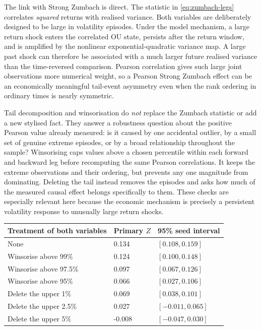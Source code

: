 \documentclass[11pt,a4paper]{article}
\begin{document}
The link with Strong Zumbach is direct. The statistic in \cref{eq:zumbach-legs} correlates
\emph{squared} returns with realised variance. Both variables are deliberately designed to be
large in volatility episodes. Under the model mechanism, a large return shock enters the
correlated OU state, persists after the return window, and is amplified by the nonlinear
exponential-quadratic variance map. A large past shock can therefore be associated with a much
larger future realised variance than the time-reversed comparison. Pearson correlation gives
such large joint observations more numerical weight, so a Pearson Strong Zumbach effect can be
an economically meaningful tail-event asymmetry even when the rank ordering in ordinary times
is nearly symmetric.

Tail decomposition and winsorisation do \emph{not} replace the Zumbach statistic or add a new
stylised fact. They answer a robustness question about the positive Pearson value already
measured: is it caused by one accidental outlier, by a small set of genuine extreme episodes, or
by a broad relationship throughout the sample? Winsorising caps values above a chosen percentile
within each forward and backward leg before recomputing the same Pearson correlations. It keeps
the extreme observations and their ordering, but prevents any one magnitude from dominating.
Deleting the tail instead removes the episodes and asks how much of the measured causal effect
belongs specifically to them. These checks are especially relevant here because the economic
mechanism is precisely a persistent volatility response to unusually large return shocks.

\begin{center}
\begin{tabularx}{0.82\textwidth}{@{}Y C{25mm} C{34mm}@{}}
\toprule
\textbf{Treatment of both variables} & \textbf{Primary \(Z\)} & \textbf{95\% seed interval} \\
\midrule
None & 0.134 & \([0.108,0.159]\) \\
Winsorise above 99\% & 0.124 & \([0.100,0.148]\) \\
Winsorise above 97.5\% & 0.097 & \([0.067,0.126]\) \\
Winsorise above 95\% & 0.066 & \([0.027,0.106]\) \\
Delete the upper 1\% & 0.069 & \([0.038,0.101]\) \\
Delete the upper 2.5\% & 0.027 & \([-0.011,0.065]\) \\
Delete the upper 5\% & -0.008 & \([-0.047,0.030]\) \\
\bottomrule
\end{tabularx}
\end{center}
\end{document}
